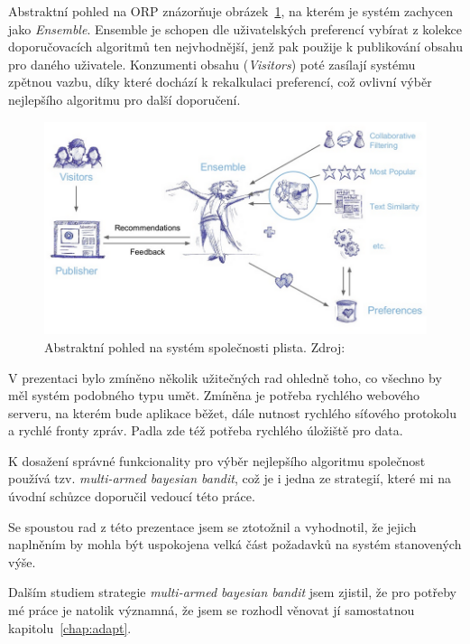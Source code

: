 \documentclass[thesis=M,czech]{FITthesis}[2014/05/07]
\begin{document}
Abstraktní pohled na ORP znázorňuje obrázek~\ref{fig:plista}, na kterém je systém zachycen jako \emph{Ensemble}. Ensemble je schopen dle uživatelských preferencí vybírat z kolekce doporučovacích algoritmů ten nejvhodnější, jenž pak použije k publikování obsahu pro daného uživatele. Konzumenti obsahu (\emph{Visitors}) poté zasílají systému zpětnou vazbu, díky které dochází k rekalkulaci preferencí, což ovlivní výběr nejlepšího algoritmu pro další doporučení.

\begin{figure}\centering
	\includegraphics[width=1.0\textwidth]{obr/plistaEnsemble.png}
 	\caption[Abstraktní pohled na systém společnosti plista]{Abstraktní pohled na systém společnosti plista. Zdroj: \cite{slideshare:plista}}\label{fig:plista}
\end{figure}	

V prezentaci bylo zmíněno několik užitečných rad ohledně toho, co všechno by měl systém podobného typu umět. Zmíněna je potřeba rychlého webového serveru, na kterém bude aplikace běžet, dále nutnost rychlého síťového protokolu a rychlé fronty zpráv. Padla zde též potřeba rychlého úložiště pro data.

K dosažení správné funkcionality pro výběr nejlepšího algoritmu společnost používá tzv. \emph{multi-armed bayesian bandit}, což je i jedna ze strategií, které mi na úvodní schůzce doporučil vedoucí této práce.

Se spoustou rad z této prezentace jsem se ztotožnil a vyhodnotil, že jejich naplněním by mohla být uspokojena velká část požadavků na systém stanovených výše.

Dalším studiem strategie \emph{multi-armed bayesian bandit} jsem zjistil, že pro potřeby mé práce je natolik významná, že jsem se rozhodl věnovat jí samostatnou kapitolu~\ref{chap:adapt}.
\end{document}
